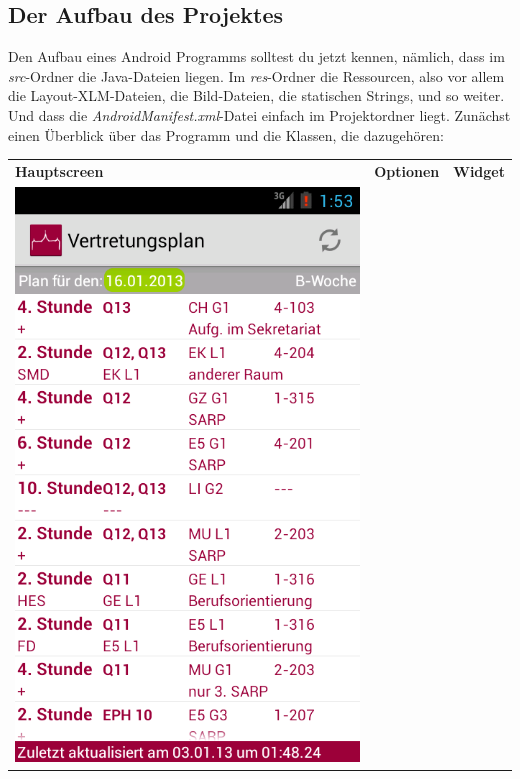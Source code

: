 \documentclass[12pt,headsepline]{scrartcl}
\begin{document}
\subsection{Der Aufbau des Projektes}
Den Aufbau eines Android Programms solltest du jetzt kennen, nämlich, dass im \textit{src}-Ordner die Java-Dateien liegen. Im \textit{res}-Ordner die Ressourcen, also vor allem die Layout-XLM-Dateien, die Bild-Dateien, die statischen Strings, und so weiter. Und dass die \textit{AndroidManifest.xml}-Datei einfach im Projektordner liegt.
Zunächst einen Überblick über das Programm und die Klassen, die dazugehören:
\begin{center}
\begin{longtable}{p{5cm}p{5cm}p{5cm}}
\textbf{Hauptscreen} & \textbf{Optionen} & \textbf{Widget}\\
\includegraphics[scale=0.28,keepaspectratio=true]{device-2013-01-16-103322.png}

\end{longtable}
\end{center}
\end{document}
